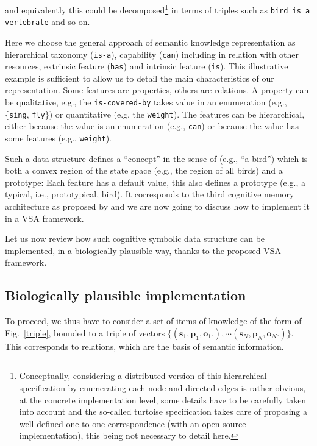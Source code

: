 \documentclass[sn-mathphys]{sn-jnl}
\begin{document}
and equivalently this could be decomposed\footnote{Conceptually, considering a distributed version of this hierarchical specification by enumerating each node and directed edges is rather obvious, at the concrete implementation level, some details have to be carefully taken into account and the so-called \href{https://line.gitlabpages.inria.fr/aide-group/wjson/turtoise.pdf}{turtoise} specification takes care of proposing a well-defined one to one correspondence (with an open source implementation), this being not necessary to detail here.} in terms of triples such as {\tt bird is\_a vertebrate} and so on.

Here we choose the \cite{mcclelland_parallel_2003} general approach of semantic knowledge representation as hierarchical taxonomy ({\tt is-a}), capability ({\tt can}) including in relation with other resources, extrinsic feature ({\tt has}) and intrinsic feature ({\tt is}).
This illustrative example is sufficient to allow us to detail the main characteristics of our representation.
Some features are properties, others are relations. A property can be qualitative, e.g., the {\tt is-covered-by} takes value in an enumeration (e.g., \{{\tt sing}, {\tt fly}\}) or quantitative (e.g. the {\tt weight}). The features can be hierarchical, either because the value is an enumeration (e.g., {\tt can}) or because the value has some features (e.g., {\tt weight}).

Such a data structure defines a ``concept'' in the sense of \cite{gardenfors_conceptual_2004} (e.g., ``a bird'') which is both a convex region of the state space (e.g., the region of all birds) and a prototype: Each feature has a default value, this also defines a prototype (e.g., a typical, i.e., prototypical, bird). It corresponds to the third cognitive memory architecture as proposed by \cite{eichenbaum_memory_2017} and we are now going to discuss how to implement it in a VSA framework.

Let us now review how such cognitive symbolic data structure can be implemented, in a biologically plausible way, thanks to the proposed VSA framework. 

\subsection{Biologically plausible implementation} \label{implementation}

To proceed, we thus have to consider a set of items of knowledge of the form of Fig.~\ref{triple}, bounded to a triple of vectors $\{(\mathbf{s}_1 ,  \mathbf{p}_1 ,  \mathbf{o}_1.), \cdots (\mathbf{s}_N ,  \mathbf{p}_N ,  \mathbf{o}_N.)\}$. This corresponds to relations, which are the basis of semantic information.
\end{document}
